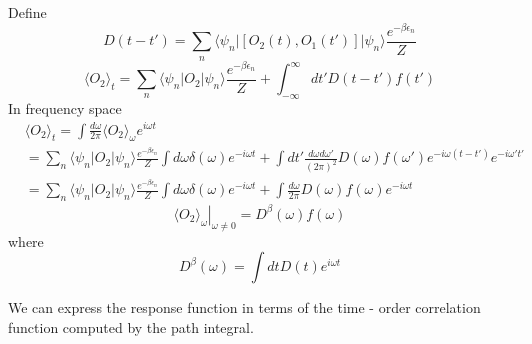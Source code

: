 \documentclass[a4paper,11pt]{article}
\begin{document}
\begin{enumerate}
  Define
  \begin{equation*}
    D(t-t')=\sum_{n}\langle\psi_n|[O_2(t),O_1(t')]|\psi_n\rangle\frac{e^{-\beta\epsilon_n}}{Z}
  \end{equation*}
  \begin{equation*}
    \langle O_2\rangle_t=\sum_{n}\langle\psi_n| O_2|\psi_n\rangle\frac{e^{-\beta\epsilon_n}}{Z}+\int_{-\infty}^{\infty}dt'D(t-t')f(t')
  \end{equation*}
  In frequency space
  \begin{equation*}
    \begin{split}
       &\langle O_2\rangle_t=\int\frac{d\omega}{2\pi}\langle O_2\rangle_\omega e^{i\omega t}\\
         &=\sum_{n}\langle\psi_n|O_2|\psi_n\rangle \frac{e^{-\beta\epsilon_n}}{Z}\int d\omega\delta(\omega)e^{-i\omega t}+\int dt'\frac{d\omega d\omega'}{(2\pi)^2}D(\omega)f(\omega')e^{-i\omega(t-t')}e^{-i\omega' t'}\\
         &=\sum_{n}\langle\psi_n|O_2|\psi_n\rangle \frac{e^{-\beta\epsilon_n}}{Z}\int d\omega\delta(\omega)e^{-i\omega t}+\int\frac{d\omega}{2\pi}D(\omega)f(\omega)e^{-i\omega t}
    \end{split}
  \end{equation*}
  \begin{equation*}
    \left.\langle O_2\rangle_\omega\right|_{\omega\neq0}=D^\beta(\omega)f(\omega)
  \end{equation*}
  where
  \begin{equation*}
    D^\beta(\omega)=\int dtD(t)e^{i\omega t}
  \end{equation*}
\end{enumerate}
We can express the response function in terms of the time - order correlation function computed by the path integral.
\end{document}
